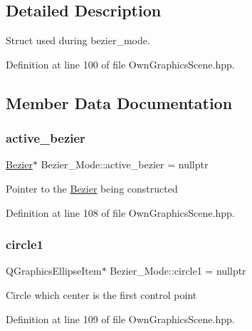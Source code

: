 \subsection{Detailed Description}
Struct used during bezier\+\_\+mode. 

Definition at line 100 of file Own\+Graphics\+Scene.\+hpp.



\subsection{Member Data Documentation}
\mbox{\label{structBezier__Mode_a9aefbd869ef59854732e405886d334fb}} 
\subsubsection{\texorpdfstring{active\+\_\+bezier}{active\_bezier}}
{\footnotesize\ttfamily \mbox{\hyperlink{classBezier}{Bezier}}$\ast$ Bezier\+\_\+\+Mode\+::active\+\_\+bezier = nullptr}

Pointer to the \mbox{\hyperlink{classBezier}{Bezier}} being constructed 

Definition at line 108 of file Own\+Graphics\+Scene.\+hpp.

\mbox{\label{structBezier__Mode_ab07833315488dc0d3c6f613c51de1d3f}} 
\subsubsection{\texorpdfstring{circle1}{circle1}}
{\footnotesize\ttfamily Q\+Graphics\+Ellipse\+Item$\ast$ Bezier\+\_\+\+Mode\+::circle1 = nullptr}

Circle which center is the first control point 

Definition at line 109 of file Own\+Graphics\+Scene.\+hpp.

\mbox{\label{structBezier__Mode_a3f6f2bdade3db15c0855820d86a5b98e}} 
